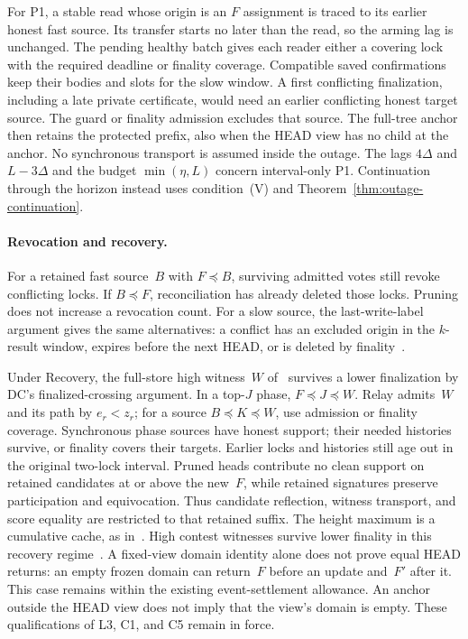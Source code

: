 \documentclass{article}
\theoremstyle{plain}
\theoremstyle{definition}
\theoremstyle{remark}
\newcommand{\DC}[1]{\cite[\S#1]{DC}}
\begin{document}
For P1, a stable read whose origin is an $F$ assignment is traced to
its earlier honest fast source.  Its transfer starts no later than the
read, so the arming lag is unchanged.  The pending healthy batch gives
each reader either a covering lock with the required deadline or
finality coverage.  Compatible saved confirmations keep their bodies and
slots for the slow window.  A first conflicting finalization, including
a late private certificate, would need an earlier conflicting honest
target source.  The guard or finality admission excludes that source.
The full-tree anchor then retains the protected prefix, also when the
HEAD view has no child at the anchor.  No synchronous transport is
assumed inside the outage.  The lags $4\Delta$ and $L-3\Delta$ and the
budget $\min(\eta,L)$ concern interval-only P1.  Continuation through
the horizon instead uses condition~(V) and
Theorem~\ref{thm:outage-continuation}.

\paragraph{Revocation and recovery.}  For a retained fast source~$B$ with
$F\preceq B$, surviving admitted votes still revoke conflicting
locks.  If $B\preceq F$, reconciliation has already deleted those
locks.  Pruning does not increase a revocation count.  For a slow source,
the last-write-label argument gives the same alternatives: a conflict
has an excluded origin in the $k$-result window, expires before the
next HEAD, or is deleted by finality~\cite[\S6.1]{FB}.

Under Recovery, the full-store high witness~$W$ of~\cite[\S4]{ALFS}
survives a lower finalization by DC's finalized-crossing argument.
In a top-$J$ phase, $F\preceq J\preceq W$.  Relay admits~$W$ and its
path by $e_r<z_r$; for a source $B\preceq K\preceq W$, use admission
or finality coverage.  Synchronous phase sources have honest support;
their needed histories survive, or finality covers their targets.
Earlier locks and histories still age out in the original two-lock
interval.  Pruned heads contribute no clean support on retained
candidates at or above the new~$F$, while retained signatures preserve
participation and equivocation.  Thus candidate reflection, witness
transport, and score equality are restricted to that retained suffix.
The height maximum is a cumulative cache, as in~\DC{5}.  High contest witnesses
survive lower finality in this recovery regime~\cite[\S\S6.2--6.3]{FB}.
A fixed-view domain identity alone does not prove equal HEAD returns:
an empty frozen domain can return~$F$ before an update and~$F'$ after
it.  This case remains within the existing event-settlement allowance.
An anchor outside the HEAD view does not imply that the view's domain
is empty.  These qualifications of L3, C1, and C5 remain in force.
\end{document}
